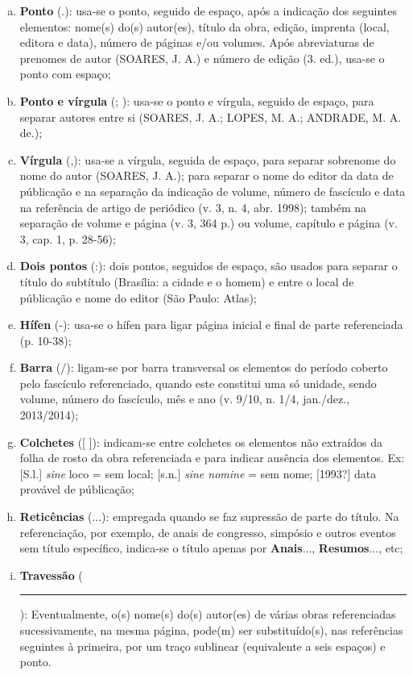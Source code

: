 \begin{enumerate}[a)]
  \item	 \textbf{Ponto} (.): usa-se o ponto, seguido de espaço, após a indicação dos seguintes elementos: nome(s) do(s) autor(es), título da obra, edição, imprenta (local, editora e data), número de páginas e/ou  volumes. Após abreviaturas de prenomes de autor (SOARES, J. A.) e número de edição (3. ed.), usa-se o ponto com espaço;
  \item	 \textbf{Ponto e vírgula} (; ): usa-se o ponto e vírgula, seguido de espaço, para separar autores entre si (SOARES, J. A.; LOPES, M. A.; ANDRADE, M. A. de.);
  \item	 \textbf{Vírgula} (,): usa-se a vírgula, seguida de espaço, para separar sobrenome do nome do autor (SOARES, J. A.); para separar o nome do editor da data de públicação e na separação da indicação de volume, número de fascículo e data na referência de artigo de periódico (v. 3, n. 4, abr. 1998); também na separação de volume e página (v. 3, 364 p.) ou volume, capítulo e página (v. 3, cap. 1, p. 28-56);
  \item	 \textbf{Dois pontos} (:): dois pontos, seguidos de espaço, são usados para separar o título do subtítulo (Brasília: a cidade e o homem) e entre o local de públicação e nome do editor (São Paulo: Atlas);
  \item	 \textbf{Hífen} (-): usa-se o hífen para ligar página inicial e final de parte referenciada (p. 10-38); 
  \item	 \textbf{Barra} (/): ligam-se por barra transversal os elementos do período coberto pelo fascículo referenciado, quando este constitui uma só unidade, sendo volume, número do fascículo, mês e ano (v. 9/10, n. 1/4, jan./dez., 2013/2014); 
  \item	 \textbf{Colchetes} ([ ]):  indicam-se entre colchetes os elementos não extraídos da folha de rosto da obra referenciada e para indicar ausência  dos elementos. Ex: [S.l.] \textit{sine} loco = sem local; [s.n.] \textit{sine nomine} = sem nome; [1993?] data provável de públicação;
  \item	 \textbf{Reticências} (...): empregada quando se faz supressão de parte do título. Na referenciação, por exemplo, de anais de congresso, simpósio e outros eventos sem título específico, indica-se o título apenas por \textbf{Anais}..., \textbf{Resumos}..., etc;
  \item	 \textbf{Travessão} (\rule{1cm}{0.4pt}): Eventualmente, o(s) nome(s) do(s) autor(es) de várias obras referenciadas sucessivamente, na mesma página, pode(m) ser substituído(s), nas referências seguintes à primeira, por um traço sublinear (equivalente a seis espaços) e ponto.
\end{enumerate}


